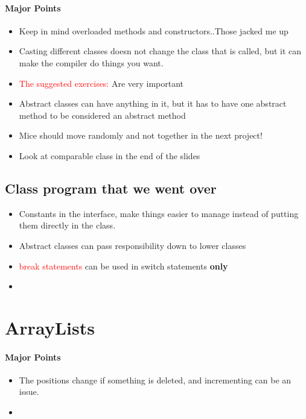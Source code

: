 \documentclass{article}
\begin{document}
\paragraph{Major Points}

\begin{itemize}
  \item Keep in mind overloaded methods and constructors..Those jacked me up
  \item Casting different classes doesn not change the class that is called, but
  it can make the compiler do things you want. 
  \item \textcolor{red}{The suggested exercises:} Are very important  
  \item Abstract classes can have anything in it, but it has to have one
  abstract method to be considered an abstract method
  \item Mice should move randomly and not together in the next project!
  \item Look at comparable class in the end of the slides
\end{itemize}

\subsection{Class program that we went over}

\begin{itemize}
  \item Constants in the interface, make things easier to manage instead of
  putting them directly in the class.
  \item Abstract classes can pass responsibility down to lower classes
  \item \textcolor{red}{break statements} can be used in switch statements
  \textbf{only}
  \item 
\end{itemize}

\section{ArrayLists}
\paragraph{Major Points}

\begin{itemize}
  \item The positions change if something is deleted, and incrementing can be an
  issue.
  \item 
\end{itemize}
\end{document}
